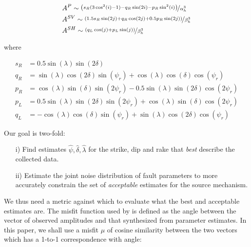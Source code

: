 \documentclass[preprint]{seismica}
\begin{document}
     \begin{align} \label{eq:eq1}
         \nonumber &A^P \sim \nicefrac{\left( s_R(3\cos^2(i) - 1) - q_R\sin(2i) - p_R\sin^2(i) \right)}{\alpha_h^3}\\
         &A^{SV} \sim \nicefrac{\left( 1.5 s_R\sin(2j) + q_R\cos(2j) + 0.5 p_R\sin(2j) \right)}{\beta_h^3}\\
         \nonumber &A^{SH} \sim \nicefrac{\left( q_L\cos(j) + p_L\sin(j) \right)}{\beta_h^3}
     \end{align}

     where

     \begin{align} \label{eq:eq2}
         \nonumber s_R &= 0.5 \sin(\lambda) \sin(2\delta)\\
         \nonumber q_R &= \sin(\lambda) \cos(2\delta) \sin(\psi_r) + \cos(\lambda) \cos(\delta) \cos(\psi_r)\\
         p_R &= \cos(\lambda) \sin(\delta) \sin(2\psi_r) - 0.5\sin(\lambda) \sin(2\delta) \cos(2\psi_r)\\
         \nonumber p_L &= 0.5\sin(\lambda) \sin(2\delta) \sin(2\psi_r) + \cos(\lambda) \sin(\delta) \cos(2\psi_r)\\
         \nonumber q_L &= -\cos(\lambda) \cos(\delta) \sin(\psi_r) + \sin(\lambda) \cos(2\delta) \cos(\psi_r)
     \end{align}

     Our goal is two-fold:
     \begin{enumerate}
         \item [i)]
            Find estimates $\widehat{\psi}, \widehat{\delta}, \widehat{\lambda}$ for the strike, dip and rake that \textit{best} describe the collected data.

        \item [ii)]
            Estimate the joint noise distribution of fault parameters to more accurately constrain the set of \textit{acceptable} estimates for the source mechanism.
            
     \end{enumerate}

     We thus need a metric against which to evaluate what the best and acceptable estimates are. The misfit function used by \citet{sita_potential_2022} is defined as the angle between the vector of observed amplitudes and that synthesized from parameter estimates. In this paper, we shall use a misfit $\mu$ of cosine similarity between the two vectors which has a 1-to-1 correspondence with angle:
\end{document}
